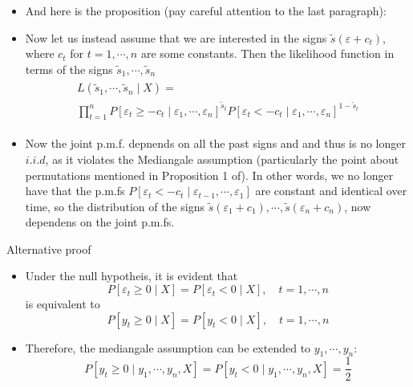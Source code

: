 \documentclass{beamer}
\begin{document}
\begin{frame}
\begin{itemize}
\item{} And here is the proposition (pay careful attention to the last paragraph):
\end{itemize}
\end{frame}

\begin{frame}
\begin{itemize}
\item{} Now let us instead assume that we are interested in the signs $\tilde{s}(\varepsilon+c_t)$, where $c_t$ for $t=1,\cdots,n$ are some constants. Then the likelihood function in terms of the signs $\tilde{s}_1,\cdots,\tilde{s}_n$ 
\begin{align*}
\begin{array}{l}
L(\tilde{s}_1,\cdots,\tilde{s}_n\mid X)=\\
\prod\limits_{t=1}^{n}P[\varepsilon_t\geq -c_t\mid \varepsilon_1,\cdots,\varepsilon_n]^{\tilde{s}_t}P[\varepsilon_t< -c_t \mid \varepsilon_1,\cdots,\varepsilon_n]^{1-\tilde{s}_t}	
\end{array}
\end{align*}
\item{} Now the joint p.m.f. depnends on all the past signs and and thus is no longer $i.i.d$, as it violates the Mediangale assumption (particularly the point about permutations mentioned in Proposition 1 of). In other words, we no longer have that the p.m.fs $P[\varepsilon_t<-c_t\mid \varepsilon_{t-1},\cdots,\varepsilon_{1}]$ are constant and identical over time, so the distribution of the signs $\tilde{s}(\varepsilon_1+c_1),\cdots,\tilde{s}(\varepsilon_n+c_n)$, now dependens on the joint p.m.fs.
\end{itemize}
\end{frame}

\begin{frame}{Alternative proof}
\begin{itemize}
\item{}Under the null hypotheis, it is evident that
\[
P[\varepsilon_t\geq0\mid X]=P[\varepsilon_t<0\mid X],\quad t=1,\cdots,n
\]
is equivalent to
\[
P[y_t\geq0\mid X]=P[y_t<0\mid X],\quad t=1,\cdots,n
\]
\item{}Therefore, the mediangale assumption can be extended to $y_1,\cdots,y_n$:
\[
P[y_t\geq0\mid y_1,\cdots,y_n,X]=P[y_t<0\mid y_1,\cdots,y_n,X]=\frac{1}{2}
\]
\end{itemize}
\end{frame}
\end{document}
